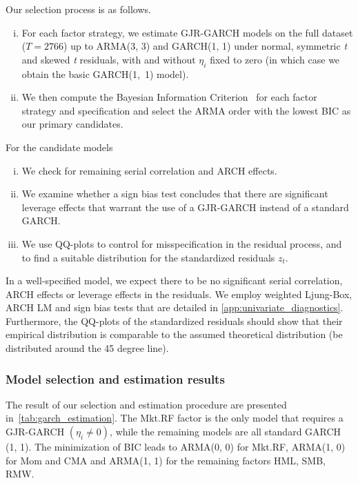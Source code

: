 Our selection process is as follows.

\begin{enumerate}[(i)]
  \item For each factor strategy, we estimate GJR-GARCH models on the full dataset ($T = 2766$) up to ARMA(3, 3) and GARCH(1, 1) under normal, symmetric \emph{t} and skewed \emph{t} residuals, with and without $\eta_i$ fixed to zero (in which case we obtain the basic GARCH(1,~1) model).
  \item We then compute the Bayesian Information Criterion~\autocite[BIC]{Schwarz1978} for each factor strategy and specification and select the ARMA order with the lowest BIC as our primary candidates.
\end{enumerate}

\noindent For the candidate models

\begin{enumerate}[(i)]
  \item We check for remaining serial correlation and ARCH effects.
  \item We examine whether a sign bias test concludes that there are significant leverage effects that warrant the use of a GJR-GARCH instead of a standard GARCH.
  \item We use QQ-plots to control for misspecification in the residual process, and to find a suitable distribution for the standardized residuals $z_t$.
\end{enumerate}

In a well-specified model, we expect there to be no significant serial correlation, ARCH effects or leverage effects in the residuals. We employ weighted Ljung-Box, ARCH LM and sign bias tests that are detailed in \autoref{app:univariate_diagnostics}. Furthermore, the QQ-plots of the standardized residuals should show that their empirical distribution is comparable to the assumed theoretical distribution (be distributed around the 45 degree line).

\subsubsection{Model selection and estimation results}

The result of our selection and estimation procedure are presented in~\autoref{tab:garch_estimation}. The Mkt.RF factor is the only model that requires a GJR-GARCH $(\eta_i \neq 0)$, while the remaining models are all standard GARCH (1, 1). The minimization of BIC leads to ARMA(0, 0) for Mkt.RF, ARMA(1, 0) for Mom and CMA and ARMA(1, 1) for the remaining factors HML, SMB, RMW. 

